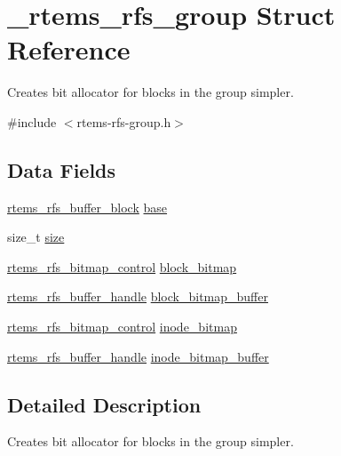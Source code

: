 \hypertarget{struct__rtems__rfs__group}{}\section{\+\_\+rtems\+\_\+rfs\+\_\+group Struct Reference}
\label{struct__rtems__rfs__group}


Creates bit allocator for blocks in the group simpler.  




{\ttfamily \#include $<$rtems-\/rfs-\/group.\+h$>$}

\subsection*{Data Fields}
\begin{DoxyCompactItemize}
\item 
\mbox{\hyperlink{rtems-rfs-buffer_8h_a5650d53328a5af0a78198fe780aec043}{rtems\+\_\+rfs\+\_\+buffer\+\_\+block}} \mbox{\hyperlink{struct__rtems__rfs__group_a26f3266e790c5571decaab6af52b1b51}{base}}
\item 
size\+\_\+t \mbox{\hyperlink{struct__rtems__rfs__group_a3fbf816cf7cf3efbb818c150e030c0f9}{size}}
\item 
\mbox{\hyperlink{rtems-rfs-bitmaps_8h_aa1b1de5abc294444428eb1038d7f898b}{rtems\+\_\+rfs\+\_\+bitmap\+\_\+control}} \mbox{\hyperlink{struct__rtems__rfs__group_ad0c918a6d5fc64b98de1644fcd5ef981}{block\+\_\+bitmap}}
\item 
\mbox{\hyperlink{rtems-rfs-buffer_8h_a17f97c37c5273ad28d413dfd2d175e23}{rtems\+\_\+rfs\+\_\+buffer\+\_\+handle}} \mbox{\hyperlink{struct__rtems__rfs__group_ab74711fa5650c09b0f6f2ccc2beee2c3}{block\+\_\+bitmap\+\_\+buffer}}
\item 
\mbox{\hyperlink{rtems-rfs-bitmaps_8h_aa1b1de5abc294444428eb1038d7f898b}{rtems\+\_\+rfs\+\_\+bitmap\+\_\+control}} \mbox{\hyperlink{struct__rtems__rfs__group_afd8374ac9ef10d22e4cbd178c152c91b}{inode\+\_\+bitmap}}
\item 
\mbox{\hyperlink{rtems-rfs-buffer_8h_a17f97c37c5273ad28d413dfd2d175e23}{rtems\+\_\+rfs\+\_\+buffer\+\_\+handle}} \mbox{\hyperlink{struct__rtems__rfs__group_a59ece6106520b2bf8052d6209b5aa3a9}{inode\+\_\+bitmap\+\_\+buffer}}
\end{DoxyCompactItemize}


\subsection{Detailed Description}
Creates bit allocator for blocks in the group simpler. 

